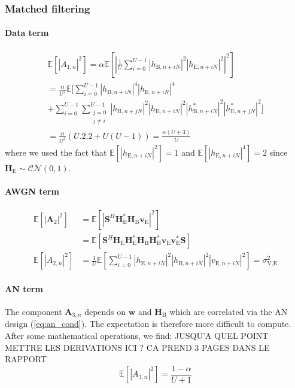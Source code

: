 \documentclass[journal,comsoc]{IEEEtran}
\newcommand{\module}[1]{\left|#1\right|}
\newcommand{\EX}[1]{\mathbb{E} \left[#1\right]}%
\newcommand{\HE}{\textbf{H}_{\text{E}}}
\newcommand{\HB}{\textbf{H}_{\text{B}}}
\newcommand{\ve}{\textbf{v}_{\text{E}}}
\newcommand{\spread}{\textbf{S}}
\begin{document}
\subsubsection{Matched filtering}\label{sec:matched-filtering-app}
\paragraph{Data term}\label{sec:data-term-app-2}
\begin{multline}
	\EX{|A_{1,n}|^2} = \alpha \EX{\left|\frac{1}{U}\sum_{i=0}^{U-1} \left| h_{\text{B}, n + iN}\right|^2 \left| h_{\text{E}, n + iN}\right|^2\right|^2} \\
	=\frac{\alpha}{U^2} \mathbb{E} \Bigg[\sum_{i=0}^{U-1} \left| h_{\text{B}, n + iN}\right|^4 \left| h_{\text{E}, n + iN}\right|^4 \\
	+ \sum_{i=0}^{U-1}\sum_{\substack{j=0 \\ j\neq i}}^{U-1}  \left| h_{\text{B}, n + jN}\right|^2 \left| h_{\text{E}, n + iN}\right|^2 \left| h^*_{\text{B}, n + iN}\right|^2 \left| h^*_{\text{E}, n + jN}\right|^2 \Bigg] \\
	= \frac{\alpha}{U^2} \left(U.2.2 + U(U-1) \right) = \frac{\alpha (U+3)}{U}
	\label{eq:data_eve_filt1-app}
\end{multline}
where we used the fact that $\EX{\left| h_{\text{E}, n + iN}\right|^2} = 1$ and $\EX{\left| h_{\text{E}, n + iN}\right|^4} = 2$ since $\HE \sim \mathcal{CN}(0,1)$.



\paragraph{AWGN term}\label{sec:awgn-term-app-2}
\begin{equation}
	\begin{split}
		\EX{|\textbf{A}_{2}|^2} &=  \EX{\module{\spread^H \HE^* \HB \ve}^2} \\
		&=\EX{\spread^H   \HE \HE^* \HB\HB^*  \ve \ve^* \spread } \\
		\EX{|A_{2,n}|^2} &= \frac{1}{U} \EX{\sum_{i=0}^{U-1} |h_{\text{E}, n + iN}|^2 |h_{\text{B}, n + iN}|^2 |v_{\text{E}, n + iN}|^2} = \sigma^2_{\text{V,E}}
	\end{split}
	\label{eq:noise_eve_filt1-app}
\end{equation}

\paragraph{AN term}\label{sec:an-term-app-2}
The component $\textbf{A}_{3,n}$ depends on $\textbf{w}$ and $\HB$ which are correlated via the AN design (\ref{eq:an_cond}). The expectation is therefore more difficult to compute. After some mathematical operations, we find: {\color{red} JUSQU'A QUEL POINT METTRE LES DERIVATIONS ICI ? CA PREND 3 PAGES DANS LE RAPPORT}
\begin{equation}
	\EX{|A_{3,n}|^2} = \frac{1-\alpha}{U+1}
	\label{eq:an_eve_filt1-app}
\end{equation}
\end{document}
